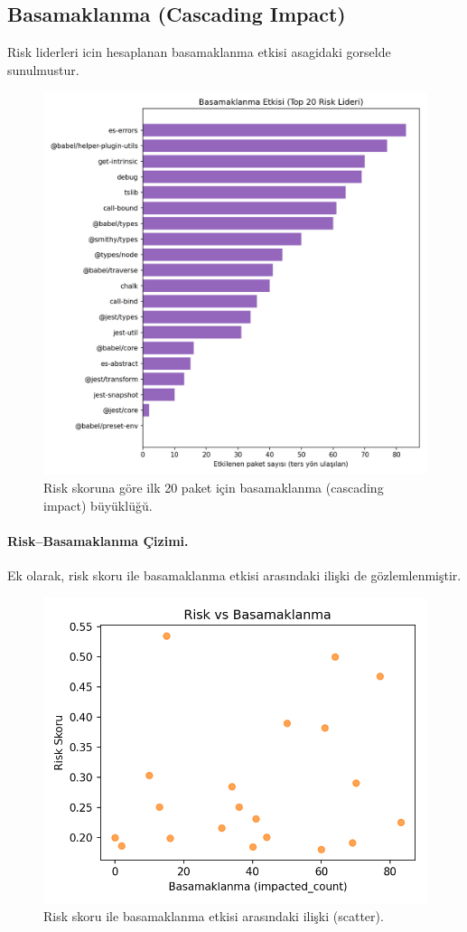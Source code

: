 \documentclass[11pt,a4paper]{article}
\begin{document}
\subsection{Basamaklanma (Cascading Impact)}
Risk liderleri icin hesaplanan basamaklanma etkisi asagidaki gorselde sunulmustur.
\begin{figure}[h]
  \centering
  \includegraphics[width=0.75\linewidth]{cascade_impact_top20.png}

  \caption{Risk skoruna g\"ore ilk 20 paket i\c{c}in basamaklanma (cascading impact) b\"uy\"ukl\"u\u{g}\u{u}.}
\end{figure}

\paragraph{Risk--Basamaklanma \c{C}izimi.} Ek olarak, risk skoru ile basamaklanma etkisi aras\i ndaki ili\c{s}ki de g\"ozlemlenmi\c{s}tir.
\begin{figure}[h]
  \centering
  \includegraphics[width=0.6\linewidth]{risk_vs_cascade.png}

  \caption{Risk skoru ile basamaklanma etkisi aras\i ndaki ili\c{s}ki (scatter).}
\end{figure}
\end{document}
